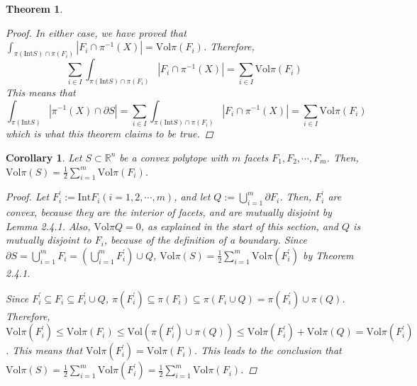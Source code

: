 \documentclass[a4paper]{article}
\newtheorem{thm}{Theorem}[subsection]
\newtheorem{cor}{Corollary}[subsection]
\theoremstyle{definition}
\begin{document}
\begin{thm}
\begin{proof}
In either case, we have proved that $\int_{\pi(\mathrm{Int}S)\cap \pi(F_i)}|F_i\cap \pi^{-1}(X)|=\mathrm{Vol}\pi(F_i)$. Therefore, \begin{equation}\sum_{i\in I}\int_{\pi(\mathrm{Int}S)\cap \pi(F_i)}|F_i\cap \pi^{-1}(X)|=\sum_{i\in I}\mathrm{Vol}\pi(F_i)\end{equation} This means that \begin{equation}\int_{\pi(\mathrm{Int}S)}|\pi^{-1}(X)\cap\partial S|=\sum_{i\in I}\int_{\pi(\mathrm{Int}S)\cap \pi(F_i)}|F_i\cap \pi^{-1}(X)|=\sum_{i\in I} \mathrm{Vol}\pi(F_i)\end{equation} which is what this theorem claims to be true.
\end{proof}
\end{thm}
\begin{cor} Let $S\subset\mathbb{R}^n$ be a convex polytope with $m$ facets $F_1,F_2,\cdots,F_m$. Then, $\mathrm{Vol}\pi(S)=\frac{1}{2}\sum\limits_{i=1}^m \mathrm{Vol}\pi(F_i)$.
\begin{proof}
Let $F^\prime _i:=\mathrm{Int}F_i(i=1,2,\cdots,m)$, and let $Q:=\bigcup\limits_{i=1}^{m}\partial F_i$. Then, $F^\prime_i$ are convex, because they are the interior of facets, and are mutually disjoint by Lemma 2.4.1. Also, $\mathrm{Vol}\pi Q=0$, as explained in the start of this section, and $Q$ is mutually disjoint to $F_i$, because of the definition of a boundary. Since $\partial S=\bigcup\limits_{i=1}^{m}F_i =(\bigcup\limits_{i=1}^{m}F^{\prime}_i )\cup Q$,  $\mathrm{Vol}\pi(S)=\frac{1}{2}\sum\limits_{i=1}^m \mathrm{Vol}\pi(F^\prime_i)$ by Theorem 2.4.1. 

Since $F^\prime_i\subseteq F_i\subseteq F^\prime_i\cup Q$, $\pi(F^\prime_i)\subseteq\pi(F_i)\subseteq \pi(F_i\cup Q)=\pi(F^\prime_i)\cup\pi(Q)$. Therefore, $\mathrm{Vol}\pi(F^\prime_i)\le\mathrm{Vol}\pi(F_i)\le\mathrm{Vol}(\pi(F^\prime_i)\cup\pi(Q))\le\mathrm{Vol}\pi(F^\prime_i)+\mathrm{Vol}\pi(Q)=\mathrm{Vol}\pi(F^\prime_i)$. This means that $\mathrm{Vol}\pi(F^\prime_i)=\mathrm{Vol}\pi(F_i)$. This leads to the conclusion that $\mathrm{Vol}\pi(S)=\frac{1}{2}\sum\limits_{i=1}^m \mathrm{Vol}\pi(F^\prime_i)=\frac{1}{2}\sum\limits_{i=1}^m \mathrm{Vol}\pi(F_i)$.
\end{proof}
\end{cor}
\end{document}
